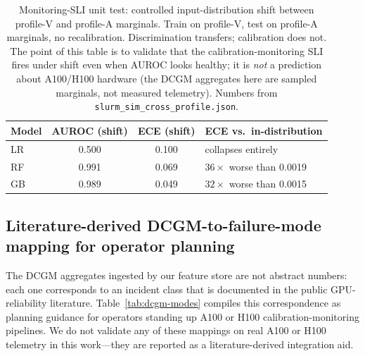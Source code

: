 \documentclass[conference]{IEEEtran}
\begin{document}
\begin{table}[!htbp]
\caption{Monitoring-SLI unit test: controlled input-distribution shift between profile-V and profile-A marginals. Train on profile-V, test on profile-A marginals, no recalibration. Discrimination transfers; calibration does not. The point of this table is to validate that the calibration-monitoring SLI fires under shift even when AUROC looks healthy; it is \emph{not} a prediction about A100/H100 hardware (the DCGM aggregates here are sampled marginals, not measured telemetry). Numbers from \texttt{slurm\_sim\_cross\_profile.json}.}
\label{tab:cross}
\centering
\scriptsize
\setlength{\tabcolsep}{4pt}
\begin{tabular}{lccl}
\toprule
Model & AUROC (shift) & ECE (shift) & ECE vs.\ in-distribution \\
\midrule
LR  & 0.500 & 0.100 & collapses entirely \\
RF  & 0.991 & 0.069 & $36\times$ worse than 0.0019 \\
GB  & 0.989 & 0.049 & $32\times$ worse than 0.0015 \\
\bottomrule
\end{tabular}
\end{table}

\subsection{Literature-derived DCGM-to-failure-mode mapping for operator planning}
\label{sec:dcgm-modes}
The DCGM aggregates ingested by our feature store are not abstract numbers: each one corresponds to an incident class that is documented in the public GPU-reliability literature. Table~\ref{tab:dcgm-modes} compiles this correspondence as planning guidance for operators standing up A100 or H100 calibration-monitoring pipelines. We do not validate any of these mappings on real A100 or H100 telemetry in this work---they are reported as a literature-derived integration aid.
\end{document}
